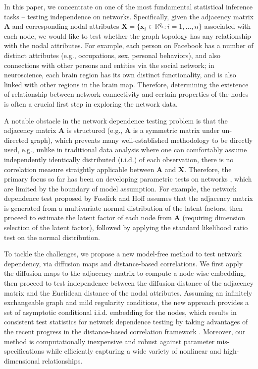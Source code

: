 \documentclass[11pt]{article}
\theoremstyle{definition}
\begin{document}
In this paper, we concentrate on one of the most fundamental statistical inference tasks -- testing independence on networks. Specifically, given the adjacency matrix $\mathbf{A}$ and corresponding nodal attributes $\mathbf{X} = \{  \mathbf{x}_{i} \in \mathbb{R}^{q_{x}} : i = 1, \ldots, n \}$ associated with each node, we would like to test whether the graph topology has any relationship with the nodal attributes. For example, each person on Facebook has a number of distinct attributes (e.g., occupations, sex, personal behaviors), and also connections with other persons and entities via the social network; in neuroscience, each brain region has its own distinct functionality, and is also linked with other regions in the brain map. Therefore, determining the existence of relationship between network connectivity and certain properties of the nodes is often a crucial first step in exploring the network data. 

A notable obstacle in the network dependence testing problem is that the adjacency matrix $\mathbf{A}$ is structured (e.g., $\mathbf{A}$ is a symmetric matrix under un-directed graph), which prevents many well-established methodology to be directly used, e.g., unlike in traditional data analysis where one can comfortably assume independently identically distributed (i.i.d.) of each observation, there is no correlation measure straightly applicable between $\mathbf{A}$ and $\mathbf{X}$. Therefore, the primary focus so far has been on developing parametric tests on networks \cite{wasserman1996logit, fosdick2015testing, howard2016understanding}, which are limited by the boundary of model assumption. For example, the network dependence test proposed by Fosdick and Hoff \cite{fosdick2015testing} assumes that the adjacency matrix is generated from a multivariate normal distribution of the latent factors, then proceed to estimate the latent factor of each node from $\mathbf{A}$ (requiring dimension selection of the latent factor), followed by applying the standard likelihood ratio test on the normal distribution.

To tackle the challenges, we propose a new model-free method to test network dependency, via diffusion maps and distance-based correlations. We first apply the diffusion maps \cite{coifman2005geometric,coifman2006diffusion,lafon2006diffusion} to the adjacency matrix to compute a node-wise embedding, then proceed to test independence between the diffusion distance of the adjacency matrix and the Euclidean distance of the nodal attributes. Assuming an infinitely exchangeable graph and mild regularity conditions, the new approach provides a set of asymptotic conditional i.i.d. embedding for the nodes, which results in consistent test statistics for network dependence testing by taking advantages of the recent progress in the distance-based correlation framework \cite{szekely2007measuring,szekelyRizzo2013a, shen2016discovering}. Moreover, our method is computationally inexpensive and robust against parameter mis-specifications while efficiently capturing a wide variety of nonlinear and high-dimensional relationships.  
\end{document}
